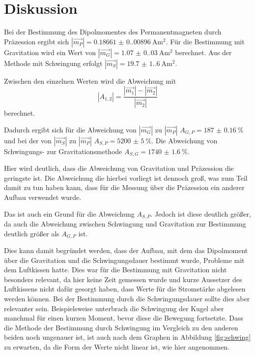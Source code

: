 \section{Diskussion}
Bei der Bestimmung des Dipolmomentes des Permanentmagneten durch Präzession ergibt sich $|\vec{m_P}|=\qty{0.18661(0.00896)}{\ampere\meter\squared}$.
Für die Bestimmung mit Gravitation wird ein Wert von $|\vec{m_G}|=\qty{1.07(0.03)}{\ampere\meter\squared}$ berechnet.
Aus der Methode mit Schwingung erfolgt $|\vec{m_S}|=\qty{19.7(1.6)}{\ampere\meter\squared}$.

Zwischen den einzelnen Werten wird die Abweichung mit 
\begin{equation}
    |A_{1,2}|=\frac{|\vec{m_1}|-|\vec{m_2}|}{|\vec{m_2}|}
\end{equation}
berechnet.

Dadurch ergibt sich für die Abweichung von $|\vec{m_G}|$ zu $|\vec{m_P}|$ $A_{G,P}=\qty{187(0.16)}{\percent}$ und bei der von $|\vec{m_S}|$ zu $|\vec{m_P}|$ $A_{S,P}=\qty{5200(5)}{\percent}$.
Die Abweichung von Schwingungs- zur Gravitationsmethode $A_{S,G}=\qty{1740(1.6)}{\percent}$.

Hier wird deutlich, dass die Abweichung von Gravitation und Präzession die geringste ist.
Die Abweichung die hierbei vorliegt ist dennoch groß, was zum Teil damit zu tun haben kann, dass für die Messung über die 
Präzession ein anderer Aufbau verwendet wurde.

Das ist auch ein Grund für die Abweichung $A_{S,P}$.
Jedoch ist diese deutlich größer, da auch die Abweichung zwischen Schwingung und Gravitation zur Bestimmung deutlich größer als $A_{G,P}$ ist.

Dies kann damit begründet werden, dass der Aufbau, mit dem das Dipolmoment über die Gravitation und 
die Schwingungsdauer bestimmt wurde, Probleme mit dem Luftkissen hatte.
Dies war für die Bestimmung mit Gravitation nicht besonders relevant, da hier keine Zeit gemessen wurde und kurze Aussetzer des Luftkissens nicht dafür gesorgt haben, dass Werte für die Stromstärke abgelesen werden können.
Bei der Bestimmung durch die Schwingungsdauer sollte dies aber relevanter sein.
Beispielsweise unterbrach die Schwingung der Kugel aber manchmal für 
einen kurzen Moment, bevor diese die Bewegung fortsetzte.
Dass die Methode der Bestimmung durch Schwingung im Vergleich zu den anderen beiden noch ungenauer ist, ist auch nach dem Graphen in Abbildung \ref{fig:schwing} zu erwarten, da die Form der Werte nicht linear ist, wie hier angenommen.
\label{sec:Diskussion}
